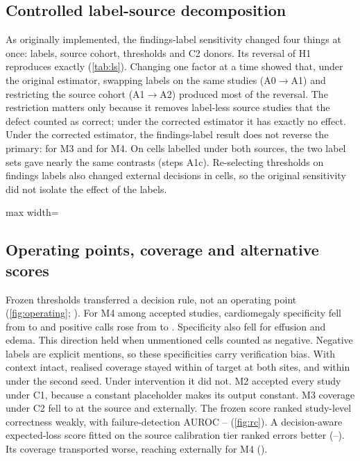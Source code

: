 \subsection*{Controlled label-source decomposition}
As originally implemented, the findings-label sensitivity changed four things
at once: labels, source cohort, thresholds and C2 donors. Its reversal of H1
reproduces exactly (\cref{tab:ls}). Changing one factor at a time showed that, under the
original estimator, swapping labels on the same studies (A0$\to$A1) and
restricting the source cohort (A1$\to$A2) produced most of the reversal. The
restriction matters only because it removes label-less source studies that the
defect counted as correct; under the corrected estimator it has exactly no
effect. Under the corrected estimator, the findings-label result does not
reverse the primary: \LSAThreeMThreeEval{} for M3 and \LSAThreeMFourEval{} for
M4. On cells labelled under both sources, the two label sets gave nearly the
same contrasts (steps A1c). Re-selecting thresholds on findings labels also
changed external decisions in \SOneCellsChanged{} cells, so the original
sensitivity did not isolate the effect of the labels.

\begin{table}[H]
\centering\footnotesize
\caption{Controlled label-source decomposition of H1 (point estimates;
intervals in the supplement). Evaluable: share of studies with at least one
labelled target.}
\label{tab:ls}
\begin{adjustbox}{max width=\linewidth}

\end{adjustbox}
\end{table}

\subsection*{Operating points, coverage and alternative scores}
Frozen thresholds transferred a decision rule, not an operating point
(\cref{fig:operating}; ). For M4 among accepted studies,
cardiomegaly specificity fell from \MFourCardSpecSrc{} to \MFourCardSpecExt{}
and positive calls rose from \MFourCardPosSrc{} to \MFourCardPosExt{}.
Specificity also fell for effusion and edema. This direction held when
unmentioned cells counted as negative. Negative labels are explicit mentions,
so these specificities carry verification bias. With context intact, realised
coverage stayed within \CovDriftMaxCZero{} of target at both sites, and within
\SeedCovDriftMax{} under the second seed. Under intervention it did not. M2
accepted every study under C1, because a constant placeholder makes its output
constant. M3 coverage under C2 fell to \MThreeCTwoCovSrc{} at the source and
\MThreeCTwoCovExt{} externally. The frozen score
ranked study-level correctness weakly, with failure-detection AUROC
\FailAUROCFrozenMin{}--\FailAUROCFrozenMax{} (\cref{fig:rc}). A decision-aware
expected-loss score fitted on the source calibration tier ranked errors better
(\FailAUROCELMin{}--\FailAUROCELMax{}). Its coverage transported worse, reaching
\ELMFourExtCov{} externally for M4 ().

